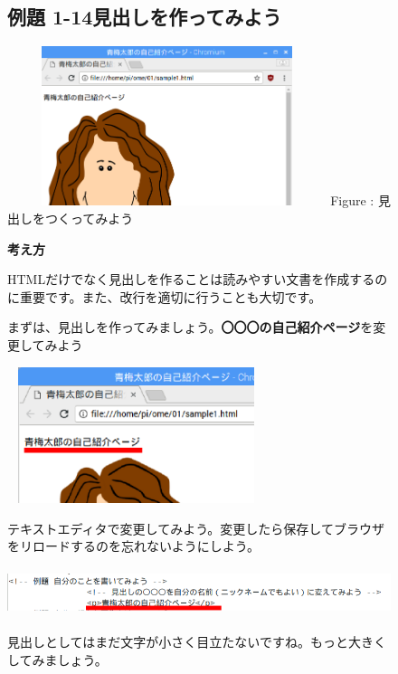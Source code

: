 \documentclass[a4paper,12pt]{jarticle}
\begin{document}
\vfill
\clearpage
\begin{figure}[ht]
  \subsection{例題 1-14見出しを作ってみよう}


  \centering
  \begin{minipage}{9.327cm}
    {\upshape
      \includegraphics[width=9.327cm,height=4.662cm]{textbook-img153.png}
      \newline
      Figure : 見出しをつくってみよう}
  \end{minipage}


  \bigskip
  \flushleft

  \textbf{考え方}



  \begin{minipage}{16.576cm}
    \flushleft

    HTMLだけでなく見出しを作ることは読みやすい文書を作成するのに重要です。また、改行を適切に行うことも大切です。

    まずは、見出しを作ってみましょう。\textbf{〇〇〇の自己紹介ページ}を変更してみよう


    \bigskip

    \includegraphics[width=7.544cm,height=3.981cm]{textbook-img154.png}


    \bigskip

    テキストエディタで変更してみよう。変更したら保存してブラウザをリロードするのを忘れないようにしよう。


    \bigskip

    \includegraphics[width=14.907cm,height=1.423cm]{textbook-img155.png}


    \bigskip


    見出しとしてはまだ文字が小さく目立たないですね。もっと大きくしてみましょう。




    \bigskip
  \end{minipage}

\end{figure}
\end{document}
